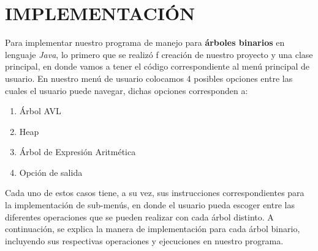 \documentclass{report}
\begin{document}
\section{IMPLEMENTACIÓN}
Para implementar nuestro programa de manejo para \textbf{árboles binarios} en lenguaje \textit{Java}, lo primero que se realizó f creación de nuestro proyecto y una clase principal, en donde vamos a tener el código correspondiente al menú principal de usuario. En nuestro menú de usuario colocamos 4 posibles opciones entre las cuales el usuario puede navegar, dichas opciones corresponden a:
\begin{enumerate}
    \item Árbol AVL
    \item Heap
    \item Árbol de Expresión Aritmética
    \item Opción de salida
\end{enumerate}
Cada uno de estos casos tiene, a su vez, sus instrucciones correspondientes para la implementación de sub-menús, en donde el usuario pueda escoger entre las diferentes operaciones que se pueden realizar con cada árbol distinto. A continuación, se explica la manera de implementación para cada árbol binario, incluyendo sus respectivas operaciones y ejecuciones en nuestro programa.
\end{document}
